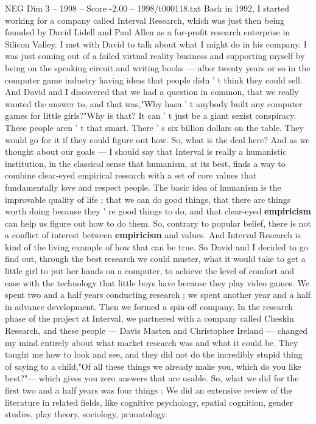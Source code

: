 \begin{textsample}{NEG Dim 3 – 1998 – Score -2.00 – 1998/t000118.txt}  \label{ex:f3_neg_004}
Back in 1992, I started working for a company called Interval Research, which was just then being founded by David Lidell and Paul Allen as a for-profit research enterprise in Silicon Valley.
I met with David to talk about what I might do in his company.
I was just coming out of a failed virtual reality business and supporting myself by being on the speaking circuit and writing books — after twenty years or so in the computer game industry having ideas that people didn ' t think they could sell.
And David and I discovered that we had a question in common, that we really wanted the answer to, and that was,"Why hasn ' t anybody built any computer games for little girls?"Why is that?
It can ' t just be a giant sexist conspiracy.
These people aren ' t that smart.
There ' s six billion dollars on the table.
They would go for it if they could figure out how.
So, what is the deal here?
And as we thought about our goals — I should say that Interval is really a humanistic institution, in the classical sense that humanism, at its best, finds a way to combine clear-eyed empirical research with a set of core values that fundamentally love and respect people.
The basic idea of humanism is the improvable quality of life ; that we can do good things, that there are things worth doing because they ' re good things to do, and that clear-eyed \textbf{empiricism} can help us figure out how to do them.
So, contrary to popular belief, there is not a conflict of interest between \textbf{empiricism} and values.
And Interval Research is kind of the living example of how that can be true.
So David and I decided to go find out, through the best research we could muster, what it would take to get a little girl to put her hands on a computer, to achieve the level of comfort and ease with the technology that little boys have because they play video games.
We spent two and a half years conducting research ; we spent another year and a half in advance development.
Then we formed a spin-off company.
In the research phase of the project at Interval, we partnered with a company called Cheskin Research, and these people — Davis Masten and Christopher Ireland — changed my mind entirely about what market research was and what it could be.
They taught me how to look and see, and they did not do the incredibly stupid thing of saying to a child,"Of all these things we already make you, which do you like best?"— which gives you zero answers that are usable.
So, what we did for the first two and a half years was four things : We did an extensive review of the literature in related fields, like cognitive psychology, spatial cognition, gender studies, play theory, sociology, primatology.

\end{textsample}
